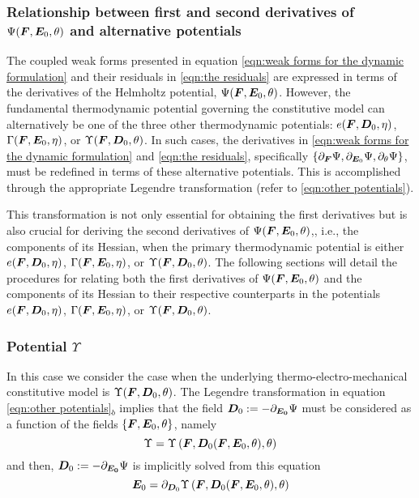\subsubsection{Relationship between first and second derivatives of $\Psi(\boldsymbol{F},\boldsymbol{E}_0,\theta)$ and alternative potentials}

The coupled weak forms presented in equation \eqref{eqn:weak forms for the dynamic formulation} and their residuals in \eqref{eqn:the residuals} are expressed in terms of the derivatives of the Helmholtz potential, $\Psi(\boldsymbol{F},\boldsymbol{E}_0,\theta)$. However, the fundamental thermodynamic potential governing the constitutive model can alternatively be one of the three other thermodynamic potentials: $e(\boldsymbol{F},\boldsymbol{D}_0,\eta)$, $\Gamma(\boldsymbol{F},\boldsymbol{E}_0,\eta)$, or $\Upsilon(\boldsymbol{F},\boldsymbol{D}_0,\theta)$. In such cases, the derivatives in \eqref{eqn:weak forms for the dynamic formulation} and  \eqref{eqn:the residuals}, specifically $\{\partial_{\boldsymbol{F}}\Psi,\partial_{\boldsymbol{E}_0}\Psi,\partial_{\theta}\Psi\}$, must be redefined in terms of these alternative potentials. This is accomplished through the appropriate Legendre transformation (refer to \eqref{eqn:other potentials}).



This transformation is not only essential for obtaining the first derivatives but is also crucial for deriving the second derivatives of $\Psi(\boldsymbol{F},\boldsymbol{E}_0,\theta)$,, i.e., the components of its Hessian, when the primary thermodynamic potential is either $e(\boldsymbol{F},\boldsymbol{D}_0,\eta)$, $\Gamma(\boldsymbol{F},\boldsymbol{E}_0,\eta)$, or $\Upsilon(\boldsymbol{F},\boldsymbol{D}_0,\theta)$. The following sections will detail the procedures for relating both the first derivatives of $\Psi(\boldsymbol{F},\boldsymbol{E}_0,\theta)$ and the components of its Hessian to their respective counterparts in the potentials $e(\boldsymbol{F},\boldsymbol{D}_0,\eta)$, $\Gamma(\boldsymbol{F},\boldsymbol{E}_0,\eta)$, or $\Upsilon(\boldsymbol{F},\boldsymbol{D}_0,\theta)$.







\subsubsection{Potential $\Upsilon$}

In this case we consider the case when the underlying thermo-electro-mechanical constitutive model is $\Upsilon(\boldsymbol{F},\boldsymbol{D}_0,\theta)$.  The Legendre transformation in equation \eqref{eqn:other potentials}$_b$ implies that the field
 $\boldsymbol{D}_0:=-\partial_{\boldsymbol{E_0}}\Psi$ must be considered as a function of the fields $\{\boldsymbol{F},\boldsymbol{E}_0,\theta\}$, namely
%
\begin{equation}\label{eqn:change of variable for Upsilon}
	\Upsilon=\Upsilon\left(\boldsymbol{F},\boldsymbol{D}_0(\boldsymbol{F},\boldsymbol{E}_0,\theta),\theta\right)
\end{equation}
%
and then, $\boldsymbol{D}_0:=-\partial_{\boldsymbol{E_0}}\Psi$ is implicitly solved from this equation
%
\begin{equation}
	\boldsymbol{E}_0=\partial_{\boldsymbol{D}_0}\Upsilon\left(\boldsymbol{F},\boldsymbol{D}_0(\boldsymbol{F},\boldsymbol{E}_0,\theta),\theta\right)
\end{equation}

